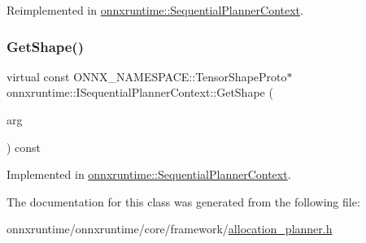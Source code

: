 Reimplemented in \mbox{\hyperlink{classonnxruntime_1_1SequentialPlannerContext_a3fbcf6cc5bd87b26efcacc2692e93059}{onnxruntime\+::\+Sequential\+Planner\+Context}}.

\mbox{\label{classonnxruntime_1_1ISequentialPlannerContext_a7665a01ff1cf7e45b2b84ef9ab2ae741}} 
\subsubsection{\texorpdfstring{Get\+Shape()}{GetShape()}}
{\footnotesize\ttfamily virtual const O\+N\+N\+X\+\_\+\+N\+A\+M\+E\+S\+P\+A\+C\+E\+::\+Tensor\+Shape\+Proto$\ast$ onnxruntime\+::\+I\+Sequential\+Planner\+Context\+::\+Get\+Shape (\begin{DoxyParamCaption}\item[{const \mbox{\hyperlink{classonnxruntime_1_1NodeArg}{onnxruntime\+::\+Node\+Arg}} \&}]{arg }\end{DoxyParamCaption}) const\hspace{0.3cm}{\ttfamily [pure virtual]}}



Implemented in \mbox{\hyperlink{classonnxruntime_1_1SequentialPlannerContext_a95afd749e2d38675bab0a41b503d575d}{onnxruntime\+::\+Sequential\+Planner\+Context}}.



The documentation for this class was generated from the following file\+:\begin{DoxyCompactItemize}
\item 
onnxruntime/onnxruntime/core/framework/\mbox{\hyperlink{allocation__planner_8h}{allocation\+\_\+planner.\+h}}\end{DoxyCompactItemize}
